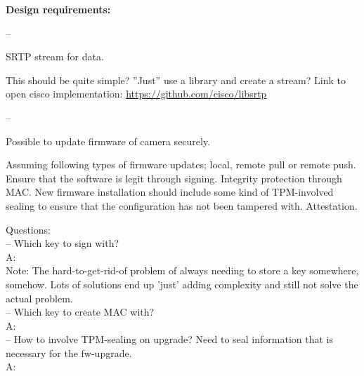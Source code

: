 \documentclass[10pt]{article}
\newenvironment{checklist}{%
  \begin{list}{}{}%
  \let\olditem\item
  \renewcommand\item{\olditem -- \marginpar{$\Box$} }
  \newcommand\checkeditem{\olditem -- \marginpar{$\CheckedBox$} }
}{%
  \end{list}
}
\begin{document}
    \textbf{Design requirements:}
    \begin{checklist}
      \item{
        SRTP stream for data.

        This should be quite simple? ''Just'' use a library and create a
        stream? Link to open cisco implementation:
        \url{https://github.com/cisco/libsrtp}
      }
      \item{
        Possible to update firmware of camera securely.

        Assuming following types of firmware updates; local, remote pull or
        remote push. Ensure that the software is legit through signing.
        Integrity protection through MAC. New firmware installation should
        include some kind of TPM-involved sealing to ensure that the configuration
        has not been tampered with. Attestation.

        Questions: \\
        -- Which key to sign with? \\
        A: \\
	Note: The hard-to-get-rid-of problem of always needing to store a key somewhere, somehow. Lots of solutions end up 'just' adding complexity 
	and still not solve the actual problem. \\
        -- Which key to create MAC with? \\
        A: \\
        -- How to involve TPM-sealing on upgrade? Need to seal information that
        is necessary for the fw-upgrade.\\
        A: \\

}
\end{checklist}
\end{document}
